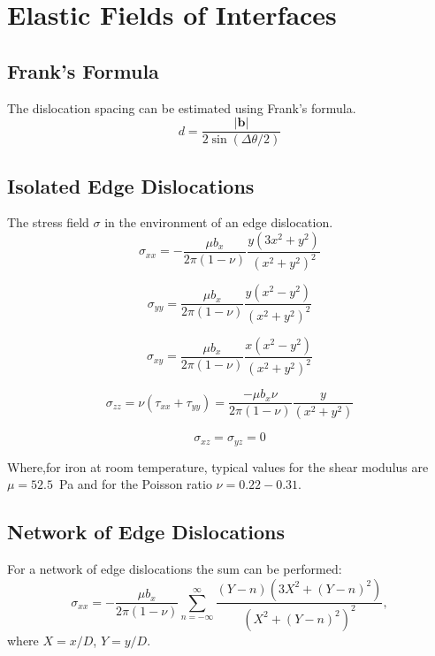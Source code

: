 \documentclass{article}
\begin{document}
\section{Elastic Fields of Interfaces}

\subsection{Frank's Formula}
The dislocation spacing can be estimated using Frank's formula.
%
\begin{equation}
d = \frac{|\mathbf{b}|}{2 \sin(\Delta\theta/2)}
\end{equation}
%
\subsection{Isolated Edge Dislocations}
The stress field $\sigma$ in the environment of an edge dislocation.
\begin{equation}
\label{eq:edgexx}
\sigma_{xx} = - \frac{\mu b_{x}}{2\pi(1-\nu)}\frac{y(3x^{2}+y^{2})}{(x^{2}+y^{2})^{2}}
\end{equation}

\begin{equation}
\label{eq:edgeyy}
\sigma_{yy} = \frac{\mu b_{x}}{2\pi(1-\nu)}\frac{y(x^{2}-y^{2})}{(x^{2}+y^{2})^{2}}
\end{equation}

\begin{equation}
\label{eq:edgexy}
\sigma_{xy} = \frac{\mu b_{x}}{2\pi(1-\nu)}\frac{x(x^{2}-y^{2})}{(x^{2}+y^{2})^{2}}
\end{equation}

\begin{equation}
\label{eq:edgezz}
\sigma_{zz}=\nu(\tau_{xx}+\tau_{yy})=\frac{-\mu b_{x}\nu}{2\pi(1-\nu)}\frac{y}{(x^{2}+y^{2})}
\end{equation}


\begin{equation}
\label{eq:edgexz}
\sigma_{xz} = \sigma_{yz} = 0
\end{equation}

Where,for iron at room temperature, typical values for the 
shear modulus are $\mu=52.5$~Pa and for the Poisson ratio $\nu=0.22-0.31$.\cite{rayne61}

\subsection{Network of Edge Dislocations}
For a network of edge dislocations the sum can be performed:
%
\begin{equation}
\label{eq:edgexx}
\sigma_{xx} = - \frac{\mu b_{x}}{2\pi(1-\nu)}\sum_{n=-\infty}^{\infty}\frac{(Y-n)(3X^{2}+(Y-n)^{2})}{(X^{2}+(Y-n)^{2})^{2}},
\end{equation}
%
where $X=x/D$, $Y=y/D$.
\end{document}
